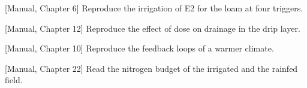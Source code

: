 \begin{exlist}
\item {\color{khblue}[Manual, Chapter 6]} Reproduce the irrigation of E2 for the loam at four triggers.\par{}
\item {\color{khblue}[Manual, Chapter 12]} Reproduce the effect of dose on drainage in the drip layer.\par{}
\item {\color{khblue}[Manual, Chapter 10]} Reproduce the feedback loops of a warmer climate.\par{}
\item {\color{khblue}[Manual, Chapter 22]} Read the nitrogen budget of the irrigated and the rainfed field.\par{}
\end{exlist}
